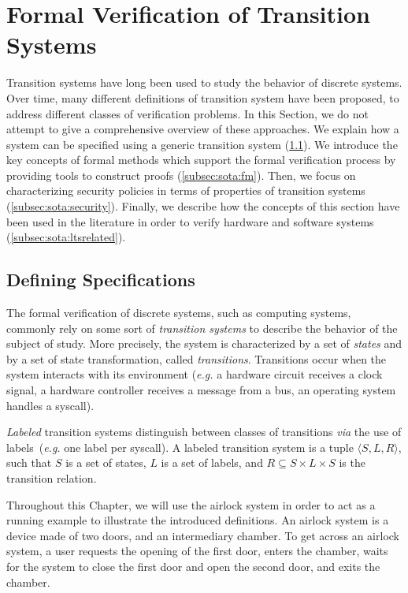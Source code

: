 \section{Formal Verification of Transition Systems}
\label{sec:sota:formalisms}

Transition systems have long been used to study the behavior of discrete
systems.
%
Over time, many different definitions of transition system have been proposed,
to address different classes of verification problems.
%
In this Section, we do not attempt to give a comprehensive overview of these
approaches.
%
We explain how a system can be specified using a generic transition system
(\ref{subsec:sota:ltsdef}).
%
We introduce the key concepts of formal methods which support the formal
verification process by providing tools to construct proofs
(\ref{subsec:sota:fm}).
%
Then, we focus on characterizing security policies in terms of properties of
transition systems (\ref{subsec:sota:security}).
%
Finally, we describe how the concepts of this section have been used in the
literature in order to verify hardware and software systems
(\ref{subsec:sota:ltsrelated}).

\subsection{Defining Specifications}
\label{subsec:sota:ltsdef}

The formal verification of discrete systems, such as computing systems, commonly
rely on some sort of \emph{transition systems} to describe the behavior of the
subject of study.
%
More precisely, the system is characterized by a set of \emph{states} and by a
set of state transformation, called \emph{transitions}.
%
Transitions occur when the system interacts with its environment (\emph{e.g.} a
hardware circuit receives a clock signal, a hardware controller receives a
message from a bus, an operating system handles a syscall).

\emph{Labeled} transition systems distinguish between classes of transitions
\emph{via} the use of labels\,\cite{loiseaux1995lts} (\emph{e.g.} one label per
syscall).
%
A labeled transition system is a tuple \( \langle S, L, R \rangle \), such that
\( S \) is a set of states, \( L \) is a set of labels, and
\( R \subseteq S \times L \times S \) is the transition relation.

Throughout this Chapter, we will use the airlock system in order to act as a
running example to illustrate the introduced definitions.
%
An airlock system is a device made of two doors, and an intermediary chamber.
%
To get across an airlock system, a user requests the opening of the first door,
enters the chamber, waits for the system to close the first door and open the
second door, and exits the chamber.

